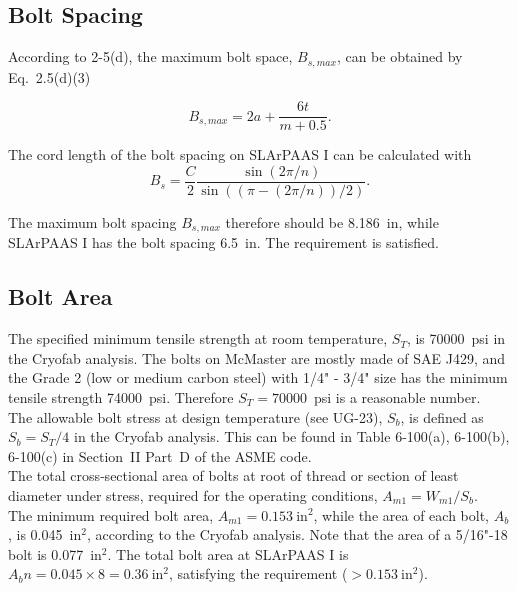 \subsection{Bolt Spacing}
\label{app:bolt_spacing}

According to 2-5(d), the maximum bolt space, $B_{s,max}$, can be obtained
by Eq.~2.5(d)(3)

\begin{equation}
    B_{s,max} = 2a + \frac{6t}{m+0.5}.
\end{equation}

The cord length of the bolt spacing on SLArPAAS I can be calculated with
\begin{equation}
    B_s = \frac{C}{2}\frac{\sin(2\pi/n)}{\sin((\pi-(2\pi/n))/2)}.
\end{equation}

The maximum bolt spacing $B_{s,max}$ therefore should be 8.186~in,
while SLArPAAS I has the bolt spacing 6.5~in.
The requirement is satisfied.

\subsection{Bolt Area}
\label{app:bolt_area}

The specified minimum tensile strength at room temperature, $S_T$,
is 70000~psi in the Cryofab analysis.
The bolts on McMaster are mostly made of SAE J429, and the Grade 2
(low or medium carbon steel) with 1/4" - 3/4" size has the minimum 
tensile strength 74000~psi.
Therefore $S_T = 70000$~psi is a reasonable number.\\

The allowable bolt stress at design temperature (see UG-23), $S_b$,
is defined as $S_b = S_T/4$ in the Cryofab analysis.
This can be found in Table 6-100(a), 6-100(b), 6-100(c) in Section~II 
Part~D of the ASME code.\\

The total cross‐sectional area of bolts at root of thread or section 
of least diameter under stress,
required for the operating conditions, $A_{m1} = W_{m1}/S_b$.\\

The minimum required bolt area, $A_{m1} = 0.153~\text{in}^2$,
while the area of each bolt, $A_b$, is 0.045~in$^2$, according to
the Cryofab analysis.
Note that the area of a 5/16"-18 bolt is 0.077~in$^2$.
The total bolt area at SLArPAAS I is $A_bn = 0.045\times 8 = 0.36~\text{in}^2$,
satisfying the requirement ($>0.153~\text{in}^2$).

